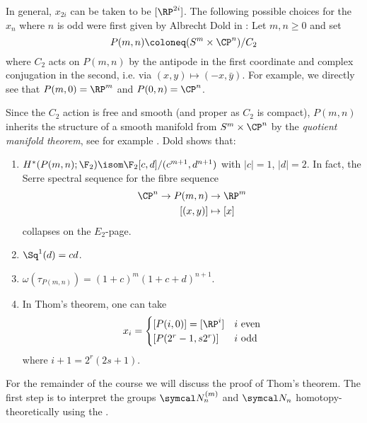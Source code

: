\begin{remark}
	In general, $x_{2i}$ can be taken to be $[\RP^{2i}]$.
	The following possible choices for the $x_n$ where $n$ is odd were first given by Albrecht Dold in \cite{dold_erzeugende_1956}:
	Let $m, n \geq 0$ and set
	\begin{equation*}
		P(m, n) \coloneq (S^m \times \CP^n) / C_2
	\end{equation*}
	where $C_2$ acts on $P(m, n)$ by the antipode in the first coordinate and complex conjugation in the second, i.e. via $(x, y) \mapsto (-x, \bar{y})$.
	For example, we directly see that $P(m, 0) = \RP^m$ and $P(0, n) = \CP^n$.

	Since the $C_2$ action is free and smooth (and proper as $C_2$ is compact), $P(m, n)$ inherits the structure of a smooth manifold from $S^m \times \CP^n$ by the \emph{quotient manifold theorem}, see for example \cite[Theorem 21.10]{lee_introduction_2012}.
	Dold shows that:
	\begin{enumerate}
		\item $H^*(P(m, n); \F_2) \isom \F_2[c, d] / (c^{m + 1}, d^{n + 1})$ with $|c| = 1$, $|d| = 2$.
			In fact, the Serre spectral sequence for the fibre sequence
			\begin{align*}
				\CP^n \to P(m, n) &\to \RP^m \\
				[(x, y)] &\mapsto [x]
			\end{align*}
			collapses on the $E_2$-page.
		\item $\Sq^1(d) = cd$.
		\item $\omega(\tau_{P(m, n)}) = (1 + c)^m (1 + c + d)^{n + 1}$.
		\item In Thom's theorem, one can take
			\begin{equation*}
				x_i = \begin{cases}
					[P(i, 0)] = [\RP^i] & i \text{ even} \\
					[P(2^r - 1, s 2^r)] & i \text{ odd}
				\end{cases}
			\end{equation*}
			where $i + 1 = 2^r (2s + 1)$.
	\end{enumerate}
\end{remark}

For the remainder of the course we will discuss the proof of Thom's theorem.
The first step is to interpret the groups $\Bord_n^{(m)}$ and $\Bord_n$ homotopy-theoretically using the .

